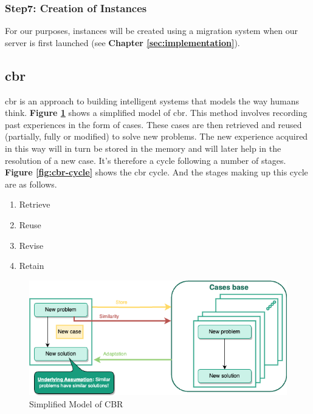     
    \subsubsection{Step7: Creation of Instances}
    For our purposes, instances will be created using a migration system when our server is first launched (see \textbf{Chapter \ref{sec:implementation}}).
    

\subsection{\acrfull{cbr} \label{subsec:cbr}}
\acrshort{cbr} is an approach to building intelligent systems that models the way humans think. \textbf{Figure \ref{fig:simple-cbr}} shows a simplified model of \acrshort{cbr}. This method involves recording past experiences in the form of cases. These cases are then retrieved and reused (partially, fully or modified) to solve new problems. The new experience acquired in this way will in turn be stored in the memory and will later help in the resolution of a new case. It's therefore a cycle following a number of stages. \textbf{Figure \ref{fig:cbr-cycle}} shows the \acrshort{cbr} cycle. And the stages making up this cycle are as follows.
    
    \begin{enumerate}
        \item Retrieve
        \item Reuse
        \item Revise
        \item Retain
    \end{enumerate}
    
    \begin{figure}[h]
    \centering
    \includegraphics[width=\textwidth]{images/Concept-simplified-cbr-Simplified CBR princip.drawio.png}
    \caption{\label{fig:simple-cbr}  Simplified Model of CBR \cite{probSolCBR}}
    \end{figure}
    
